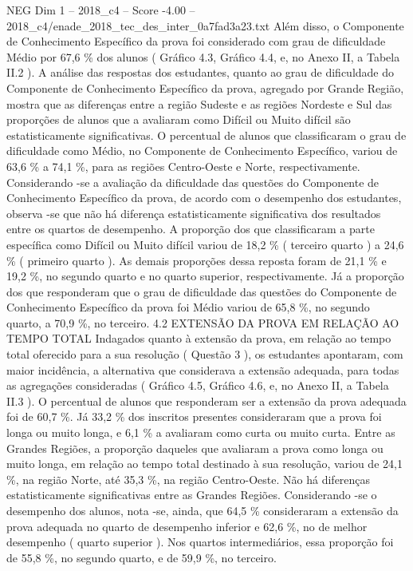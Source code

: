 \begin{textsample}{NEG Dim 1 – 2018\_c4 – Score -4.00 – 2018\_c4/enade\_2018\_tec\_des\_inter\_0a7fad3a23.txt}
Além disso, o Componente de Conhecimento Específico da prova foi considerado com grau de dificuldade Médio por 67,6 \% dos alunos ( Gráfico 4.3, Gráfico 4.4, e, no Anexo II, a Tabela II.2 ).
A análise das respostas dos estudantes, quanto ao grau de dificuldade do Componente de Conhecimento Específico da prova, agregado por Grande Região, mostra que as diferenças entre a região Sudeste e as regiões Nordeste e Sul das proporções de alunos que a avaliaram como Difícil ou Muito difícil são estatisticamente significativas.
O percentual de alunos que classificaram o grau de dificuldade como Médio, no Componente de Conhecimento Específico, variou de 63,6 \% a 74,1 \%, para as regiões Centro-Oeste e Norte, respectivamente.
Considerando -se a avaliação da dificuldade das questões do Componente de Conhecimento Específico da prova, de acordo com o desempenho dos estudantes, observa -se que não há diferença estatisticamente significativa dos resultados entre os quartos de desempenho.
A proporção dos que classificaram a parte específica como Difícil ou Muito difícil variou de 18,2 \% ( terceiro quarto ) a 24,6 \% ( primeiro quarto ).
As demais proporções dessa reposta foram de 21,1 \% e 19,2 \%, no segundo quarto e no quarto superior, respectivamente.
Já a proporção dos que responderam que o grau de dificuldade das questões do Componente de Conhecimento Específico da prova foi Médio variou de 65,8 \%, no segundo quarto, a 70,9 \%, no terceiro. 4.2 EXTENSÃO DA PROVA EM RELAÇÃO AO TEMPO TOTAL Indagados quanto à extensão da prova, em relação ao tempo total oferecido para a sua resolução ( Questão 3 ), os estudantes apontaram, com maior incidência, a alternativa que considerava a extensão adequada, para todas as agregações consideradas ( Gráfico 4.5, Gráfico 4.6, e, no Anexo II, a Tabela II.3 ).
O percentual de alunos que responderam ser a extensão da prova adequada foi de 60,7 \%.
Já 33,2 \% dos inscritos presentes consideraram que a prova foi longa ou muito longa, e 6,1 \% a avaliaram como curta ou muito curta.
Entre as Grandes Regiões, a proporção daqueles que avaliaram a prova como longa ou muito longa, em relação ao tempo total destinado à sua resolução, variou de 24,1 \%, na região Norte, até 35,3 \%, na região Centro-Oeste.
Não há diferenças estatisticamente significativas entre as Grandes Regiões.
Considerando -se o desempenho dos alunos, nota -se, ainda, que 64,5 \% consideraram a extensão da prova adequada no quarto de desempenho inferior e 62,6 \%, no de melhor desempenho ( quarto superior ).
Nos quartos intermediários, essa proporção foi de 55,8 \%, no segundo quarto, e de 59,9 \%, no terceiro.

\end{textsample}
